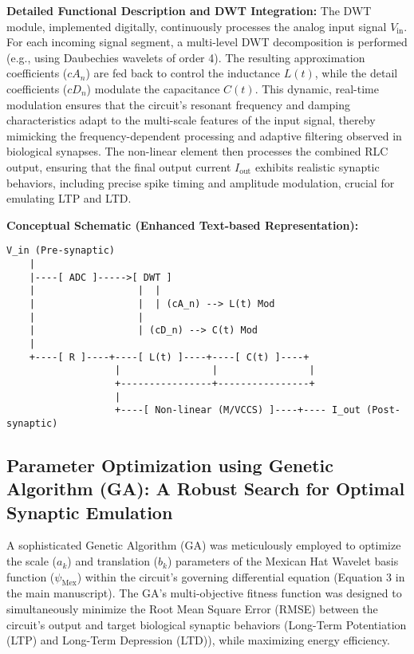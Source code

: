 \documentclass[a4paper,12pt]{article}
\begin{document}
\textbf{Detailed Functional Description and DWT Integration:}
The DWT module, implemented digitally, continuously processes the analog input signal $V_{\text{in}}$. For each incoming signal segment, a multi-level DWT decomposition is performed (e.g., using Daubechies wavelets of order 4). The resulting approximation coefficients ($cA_n$) are fed back to control the inductance $L(t)$, while the detail coefficients ($cD_n$) modulate the capacitance $C(t)$. This dynamic, real-time modulation ensures that the circuit's resonant frequency and damping characteristics adapt to the multi-scale features of the input signal, thereby mimicking the frequency-dependent processing and adaptive filtering observed in biological synapses. The non-linear element then processes the combined RLC output, ensuring that the final output current $I_{\text{out}}$ exhibits realistic synaptic behaviors, including precise spike timing and amplitude modulation, crucial for emulating LTP and LTD.

\textbf{Conceptual Schematic (Enhanced Text-based Representation):}

\begin{Verbatim}[fontsize=\footnotesize, commandchars=\\\{\}]
V_in (Pre-synaptic)
    |
    |----[ ADC ]----->[ DWT ]
    |                  |  |
    |                  |  | (cA_n) --> L(t) Mod
    |                  |
    |                  | (cD_n) --> C(t) Mod
    |
    +----[ R ]----+----[ L(t) ]----+----[ C(t) ]----+
                   |                |                |
                   +----------------+----------------+
                   |
                   +----[ Non-linear (M/VCCS) ]----+---- I_out (Post-synaptic)
\end{Verbatim}

\subsection{Parameter Optimization using Genetic Algorithm (GA): A Robust Search for Optimal Synaptic Emulation}

A sophisticated Genetic Algorithm (GA) was meticulously employed to optimize the scale ($a_k$) and translation ($b_k$) parameters of the Mexican Hat Wavelet basis function ($\psi_{\text{Mex}}$) within the circuit's governing differential equation (Equation 3 in the main manuscript). The GA's multi-objective fitness function was designed to simultaneously minimize the Root Mean Square Error (RMSE) between the circuit's output and target biological synaptic behaviors (Long-Term Potentiation (LTP) and Long-Term Depression (LTD)), while maximizing energy efficiency.
\end{document}
